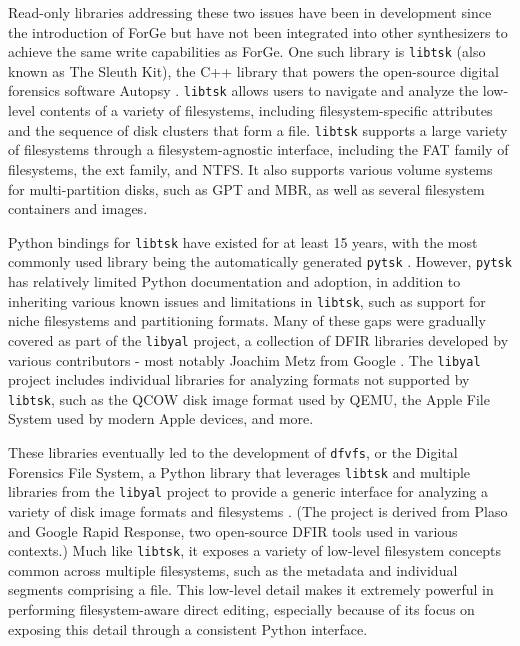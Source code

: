 \documentclass[letterpaper,12pt]{report}
\newcommand{\passthrough}[1]{#1}
\begin{document}
Read-only libraries addressing these two issues have been in development
since the introduction of ForGe but have not been integrated into other
synthesizers to achieve the same write capabilities as ForGe. One such
library is \passthrough{\lstinline!libtsk!} (also known as The Sleuth
Kit), the C++ library that powers the open-source digital forensics
software Autopsy \cite{SleuthkitSleuthkit2025}.
\passthrough{\lstinline!libtsk!} allows users to navigate and analyze
the low-level contents of a variety of filesystems, including
filesystem-specific attributes and the sequence of disk clusters that
form a file. \passthrough{\lstinline!libtsk!} supports a large variety
of filesystems through a filesystem-agnostic interface, including the
FAT family of filesystems, the ext family, and NTFS. It also supports
various volume systems for multi-partition disks, such as GPT and MBR,
as well as several filesystem containers and images.

Python bindings for \passthrough{\lstinline!libtsk!} have existed for at
least 15 years, with the most commonly used library being the
automatically generated \passthrough{\lstinline!pytsk!}
\cite{Py4n6Pytsk2025}. However, \passthrough{\lstinline!pytsk!} has
relatively limited Python documentation and adoption, in addition to
inheriting various known issues and limitations in
\passthrough{\lstinline!libtsk!}, such as support for niche filesystems
and partitioning formats. Many of these gaps were gradually covered as
part of the \passthrough{\lstinline!libyal!} project, a collection of
DFIR libraries developed by various contributors - most notably Joachim
Metz from Google \cite{LibyalLibyal2025}. The
\passthrough{\lstinline!libyal!} project includes individual libraries
for analyzing formats not supported by \passthrough{\lstinline!libtsk!},
such as the QCOW disk image format used by QEMU, the Apple File System
used by modern Apple devices, and more.

These libraries eventually led to the development of
\passthrough{\lstinline!dfvfs!}, or the Digital Forensics File System, a
Python library that leverages \passthrough{\lstinline!libtsk!} and
multiple libraries from the \passthrough{\lstinline!libyal!} project to
provide a generic interface for analyzing a variety of disk image
formats and filesystems \cite{Log2timelineDfvfs2025}. (The project
is derived from Plaso and Google Rapid Response, two open-source DFIR
tools used in various contexts.) Much like
\passthrough{\lstinline!libtsk!}, it exposes a variety of low-level
filesystem concepts common across multiple filesystems, such as the
metadata and individual segments comprising a file. This low-level
detail makes it extremely powerful in performing filesystem-aware direct
editing, especially because of its focus on exposing this detail through
a consistent Python interface.
\end{document}
